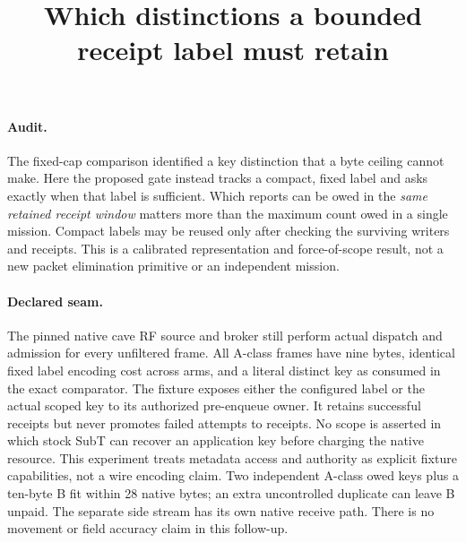 \documentclass{article}
\title{Which distinctions a bounded receipt label must retain}
\author{}
\date{}
\begin{document}
\maketitle
\paragraph{Audit.}
The fixed-cap comparison identified a key distinction that a byte
ceiling cannot make. Here the proposed gate instead tracks a compact,
fixed label and asks exactly when that label is sufficient. Which
reports can be owed in the \emph{same retained receipt window} matters
more than the maximum count owed in a single mission. Compact labels
may be reused only after checking the surviving writers and receipts.
This is a calibrated representation and force-of-scope result,
not a new packet elimination primitive or an independent mission.

\paragraph{Declared seam.}
The pinned native cave RF source and broker still perform actual
dispatch and admission for every unfiltered frame. All A-class
frames have nine bytes, identical fixed label encoding cost across
arms, and a literal distinct key as consumed in the exact comparator.
The fixture exposes either the configured label or the actual scoped
key to its authorized pre-enqueue owner. It retains successful
receipts but never promotes failed attempts to receipts. No scope is
asserted in which stock SubT can recover an application key before
charging the native resource. This experiment treats metadata access
and authority as explicit fixture capabilities, not a wire encoding
claim. Two independent A-class owed keys plus a ten-byte B fit
within 28 native bytes; an extra uncontrolled duplicate can leave
B unpaid. The separate side stream has its own native receive path.
There is no movement or field accuracy claim in this follow-up.
\end{document}
